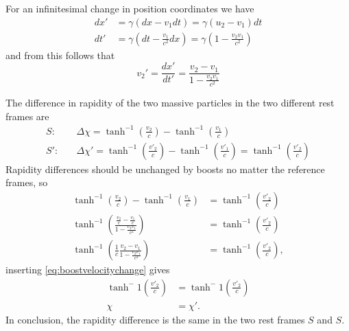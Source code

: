 \documentclass[11pt]{amsart}
\begin{document}
For an infinitesimal change in position coordinates we have
\begin{align*}
dx'  &= \gamma(dx - v_1dt) = \gamma(u_2-v_1)dt \\
dt'  &= \gamma(dt - \frac{v_1}{c^2}dx) = \gamma(1 - \frac{v_2v_1}{c^2})
\end{align*}
and from this follows that
\begin{equation}
\label{eq:boostvelocitychange}
v_2' = \frac{dx'}{dt'} = \frac{v_2-v_1}{1-\frac{v_2v_1}{c^2}}
\end{equation}

The difference in rapidity of the two massive particles in the two different rest frames are
\begin{align}
S: &\quad \Delta\chi = \tanh^{-1}\left(\frac{v_2}{c}\right) - \tanh^{-1}\left(\frac{v_1}{c}\right) \\
S':&\quad \Delta\chi' = \tanh^{-1}\left(\frac{v'_2}{c}\right) - \tanh^{-1}\left(\frac{v'_1}{c}\right) = \tanh^{-1}\left(\frac{v'_2}{c}\right)
\end{align}
Rapidity differences should be unchanged by boosts no matter the reference frames, so
\begin{align*}
\tanh^{-1}\left(\frac{v_2}{c}\right) - \tanh^{-1}\left(\frac{v_1}{c}\right) &= \tanh^{-1}\left(\frac{v'_2}{c}\right) \\
\tanh^{-1}\left(\frac{\frac{v_2}{c}-\frac{v_1}{c}}{1-\frac{v_2v_1}{c^2}} \right) &= \tanh^{-1}\left(\frac{v'_2}{c}\right) \\
\tanh^{-1}\left(\frac{1}{c}\frac{v_2-v_1}{1-\frac{v_2v_1}{c^2}} \right) &= \tanh^{-1}\left(\frac{v'_2}{c}\right),
\end{align*}
inserting \ref{eq:boostvelocitychange} gives
\begin{align*}
\tanh^-1\left(\frac{v'_2}{c} \right) &= \tanh^-1\left(\frac{v'_2}{c} \right) \\
\chi &= \chi'.
\end{align*}
In conclusion, the rapidity difference is the same in the two rest frames $S$ and $S$.
\end{document}
